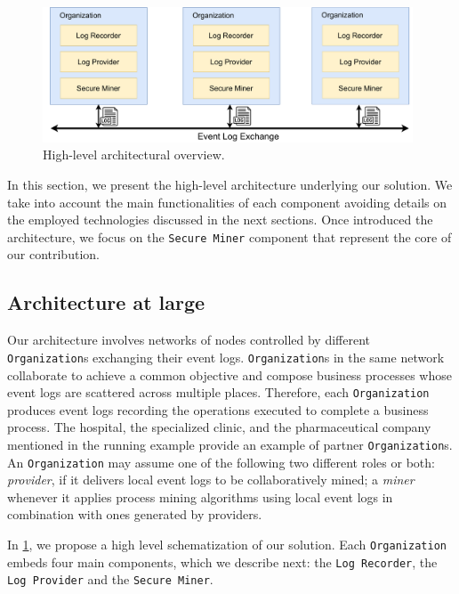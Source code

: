 \begin{figure}[t]
\centering
\includegraphics[width=11cm]{content/figures/architecture_diagram.pdf}
\caption{High-level architectural overview.}
\label{fig:architecture_diagram}
\end{figure}
In this section, we present the high-level architecture underlying our solution. We take into account the main functionalities of each component avoiding details on the employed technologies discussed in the next sections. Once introduced the architecture, we focus on the \texttt{Secure Miner} component that represent the core of our contribution.

\subsection{Architecture at large}
Our architecture involves networks of nodes controlled by different \texttt{Organization}s exchanging their event logs. \texttt{Organization}s in the same network collaborate to achieve a common objective and compose business processes whose event logs are scattered across multiple places. Therefore, each \texttt{Organization} produces event logs recording the operations executed to complete a business process. The hospital, the specialized clinic, and the pharmaceutical company mentioned in the running example provide an example of partner \texttt{Organization}s. An \texttt{Organization} may assume one of the following two different roles or both: \textit{provider}, if it delivers local event logs to be collaboratively mined; a \textit{miner} whenever it applies process mining algorithms using local event logs in combination with ones generated by providers. %

In \cref{fig:architecture_diagram}, we propose a high level schematization of our solution. Each \texttt{Organization} embeds four main components, which we describe next: the \texttt{Log Recorder}, the \texttt{Log Provider} and the \texttt{Secure Miner}.


